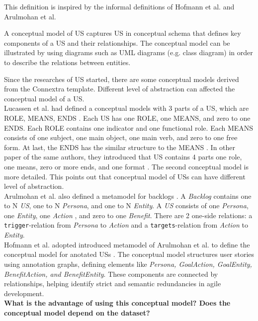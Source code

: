 \documentclass[a4paper, 11 pt, leqno, titlepage = true, toc=bib, oneside]{scrbook}
\begin{document}
This definition is inspired by the informal definitions of Hofmann et al. and Arulmohan et al.
\begin{defin}
    A conceptual model of US captures US in conceptual schema that defines key components of a US and their relationships. The conceptual model can be illustrated by using diagrams such as UML diagrams (e.g. class diagram) in order to describe the relations between entities.
\end{defin}
Since the researches of US started, there are some conceptual models derived from the Connextra template. Different level of abstraction can affected the conceptual model of a US.\\
Lucassen et al. had defined a conceptual models with 3 parts of a US, which are ROLE, MEANS, ENDS \cite{5}. Each US has one ROLE, one MEANS, and zero to one ENDS. Each ROLE contains one indicator and one functional role. Each MEANS consists of one subject, one main object, one main verb, and zero to one free form. At last, the ENDS has the similar structure to the MEANS \cite{5}. In other paper of the same authors, they introduced that US contains 4 parts one role, one means, zero or more ends, and one format \cite{LucassenFramework}. The second conceptual model is more detailed. This points out that conceptual model of USs can have different level of abstraction. \\
Arulmohan et al. also defined a metamodel for backlogs \cite{ArulmohanDomainModels}. A \textit{Backlog} contains one to N \textit{US}, one to N \textit{Persona}, and one to N \textit{Entity}. A \textit{US} consists of one \textit{Persona}, one \textit{Entity}, one \textit{Action} , and zero to one \textit{Benefit}. There are 2 one-side relations: a \texttt{trigger}-relation from \textit{Persona} to \textit{Action} and a \texttt{targets}-relation from \textit{Action} to \textit{Entity}.\\
Hofmann et al. adopted introduced metamodel of Arulmohan et al. to define the conceptual model for anotated USs \cite{4}. The conceptual model structures user stories using annotation graphs, defining elements like \textit{Persona, GoalAction, GoalEntity, BenefitAction, and BenefitEntity}. These components are connected by relationships, helping identify strict and semantic redundancies in agile development.\\
\textbf{What is the advantage of using this conceptual model? Does the conceptual model depend on the dataset?}
\end{document}
